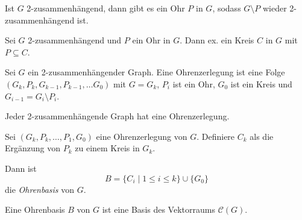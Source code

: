 \begin{theorem}
    Ist $ G $ 2-zusammenhängend, dann gibt es ein Ohr $ P $ in $ G $, sodass $ G \setminus P $ wieder 2-zusammenhängend ist.
\end{theorem}

\begin{proposition}
    Sei $ G $ 2-zusammenhängend und $ P $ ein Ohr in $ G $.
    Dann ex. ein Kreis $ C $ in $ G $ mit $ P \subseteq C $.
\end{proposition}

\begin{definition}[Ohrenzerlegung]
    Sei $ G $ ein 2-zusammenhängender Graph.
    Eine Ohrenzerlegung ist eine Folge $ (G_k, P_k, G_{k - 1}, P_{k - 1}, \dots G_0) $ mit $ G = G_k $, $ P_i $ ist ein Ohr, $ G_0 $ ist ein Kreis und $ G_{i - 1} = G_i \setminus P_i $.
\end{definition}

\begin{proposition}
    Jeder 2-zusammenhängende Graph hat eine Ohrenzerlegung.
\end{proposition}

\begin{definition}[Ohrenbasis]
    Sei $ (G_k, P_k, \dots, P_1, G_0) $ eine Ohrenzerlegung von $ G $.
    Definiere $ C_k $ als die Ergänzung von $ P_k $ zu einem Kreis in $ G_k $.

    Dann ist
    \begin{equation*}
        B = \{ C_i \mid 1 \leq i \leq k \} \cup \{ G_0 \}
    \end{equation*}
    die \textit{Ohrenbasis} von $ G $.
\end{definition}

\begin{theorem}
    Eine Ohrenbasis $ B $ von $ G $ ist eine Basis des Vektorraums $ \mathcal{C}(G) $.
\end{theorem}

